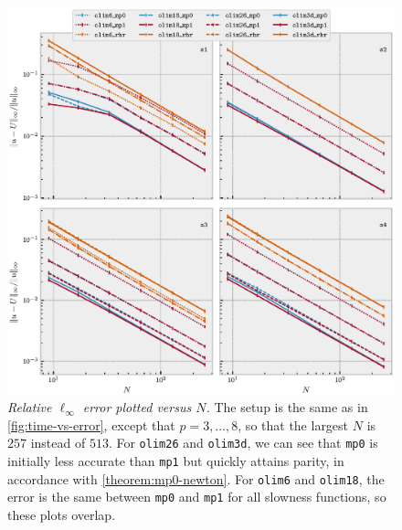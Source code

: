 \documentclass[sisc-eikonal.tex]{subfiles}
\begin{document}
\begin{figure}
  \centering \includegraphics[width=\linewidth]{size_vs_error_3d.eps}
  \caption{\emph{Relative $\ell_\infty$ error plotted versus $N$.} The
    setup is the same as in \cref{fig:time-vs-error}, except that
    $p = 3, \hdots, 8$, so that the largest $N$ is $257$ instead of
    $513$. For \texttt{olim26} and \texttt{olim3d}, we can see that
    \texttt{mp0} is initially less accurate than \texttt{mp1} but
    quickly attains parity, in accordance with
    \cref{theorem:mp0-newton}. For \texttt{olim6} and \texttt{olim18},
    the error is the same between \texttt{mp0} and \texttt{mp1} for
    all slowness functions, so these plots
    overlap.}\label{fig:size-vs-error}
\end{figure}
\end{document}
